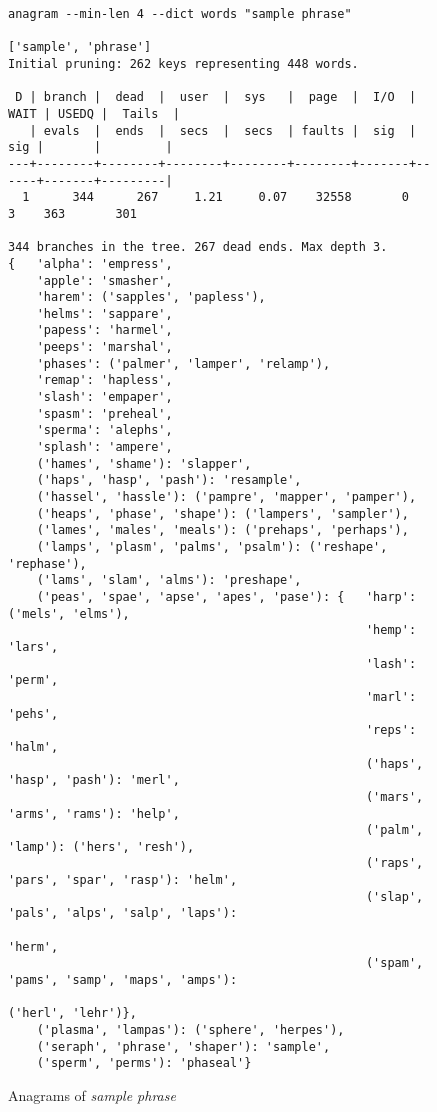 \documentclass[letterpaper, 11pt]{article}
\begin{document}
\begin{figure}
\footnotesize
\begin{verbatim}
anagram --min-len 4 --dict words "sample phrase"

['sample', 'phrase']
Initial pruning: 262 keys representing 448 words.

 D | branch |  dead  |  user  |  sys   |  page  |  I/O  | WAIT | USEDQ |  Tails  |
   | evals  |  ends  |  secs  |  secs  | faults |  sig  |  sig |       |         |
---+--------+--------+--------+--------+--------+-------+------+-------+---------|
  1      344      267     1.21     0.07    32558       0      3    363       301

344 branches in the tree. 267 dead ends. Max depth 3.
{   'alpha': 'empress',
    'apple': 'smasher',
    'harem': ('sapples', 'papless'),
    'helms': 'sappare',
    'papess': 'harmel',
    'peeps': 'marshal',
    'phases': ('palmer', 'lamper', 'relamp'),
    'remap': 'hapless',
    'slash': 'empaper',
    'spasm': 'preheal',
    'sperma': 'alephs',
    'splash': 'ampere',
    ('hames', 'shame'): 'slapper',
    ('haps', 'hasp', 'pash'): 'resample',
    ('hassel', 'hassle'): ('pampre', 'mapper', 'pamper'),
    ('heaps', 'phase', 'shape'): ('lampers', 'sampler'),
    ('lames', 'males', 'meals'): ('prehaps', 'perhaps'),
    ('lamps', 'plasm', 'palms', 'psalm'): ('reshape', 'rephase'),
    ('lams', 'slam', 'alms'): 'preshape',
    ('peas', 'spae', 'apse', 'apes', 'pase'): {   'harp': ('mels', 'elms'),
                                                  'hemp': 'lars',
                                                  'lash': 'perm',
                                                  'marl': 'pehs',
                                                  'reps': 'halm',
                                                  ('haps', 'hasp', 'pash'): 'merl',
                                                  ('mars', 'arms', 'rams'): 'help',
                                                  ('palm', 'lamp'): ('hers', 'resh'),
                                                  ('raps', 'pars', 'spar', 'rasp'): 'helm',
                                                  ('slap', 'pals', 'alps', 'salp', 'laps'): 
                                                        'herm',
                                                  ('spam', 'pams', 'samp', 'maps', 'amps'): 
                                                        ('herl', 'lehr')},
    ('plasma', 'lampas'): ('sphere', 'herpes'),
    ('seraph', 'phrase', 'shaper'): 'sample',
    ('sperm', 'perms'): 'phaseal'}
\end{verbatim}
\normalsize
\caption{Anagrams of \emph{sample phrase}}
\label{fig:samplephrase}
\end{figure}
\end{document}

